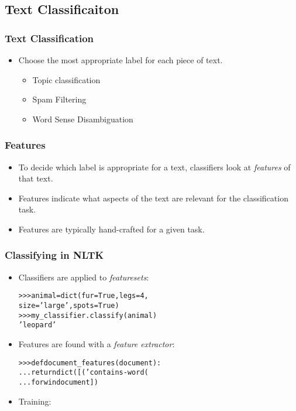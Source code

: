 \documentclass{beamer}             %
\begin{document}
\subsection{Text Classificaiton}

\begin{frame}
  \frametitle{Text Classification}
  \begin{itemize}
    \item Choose the most appropriate label for each piece of text.
    \begin{itemize}
      \item Topic classification
      \item Spam Filtering
      \item Word Sense Disambiguation
    \end{itemize}
  \end{itemize}
\end{frame}

\begin{frame}
  \frametitle{Features}
  \begin{itemize}
    \item To decide which label is appropriate for a text, 
      classifiers look at \emph{features} of that text.
    \item Features indicate what aspects of the text are
      relevant for the classification task.
    \item Features are typically hand-crafted for a given task.
  \end{itemize}
\end{frame}

\begin{frame}[fragile]
  \frametitle{Classifying in NLTK}
  \begin{itemize}
    \item Classifiers are applied to \emph{featuresets}:
\begin{alltt}\small
>>> animal = dict(fur=True, legs=4, 
                  size='large', spots=True)
>>> my_classifier.classify(animal)
'leopard'
\end{alltt}
    \item Features are found with a \emph{feature extractor}:
\begin{alltt}\small
>>> def document_features(document):
...     return dict([('contains-word(%s)'%w,True) 
...                  for w in document])
\end{alltt}
    \item Training:
  \end{itemize}
\end{frame}
\end{document}
